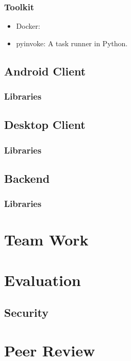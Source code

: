 \documentclass[11pt,a4paper]{report}
\begin{document}
\subsection{Toolkit}

\begin{itemize}
  \item Docker:
  \item pyinvoke: A task runner in Python.
\end{itemize}

\section{Android Client}

\subsection{Libraries}

\section{Desktop Client}

\subsection{Libraries}

\section{Backend}

\subsection{Libraries}

\chapter{Team Work}

\chapter{Evaluation}


\section{Security}


\chapter{Peer Review}

\begin{thebibliography}{9}

\end{thebibliography}
\end{document}
